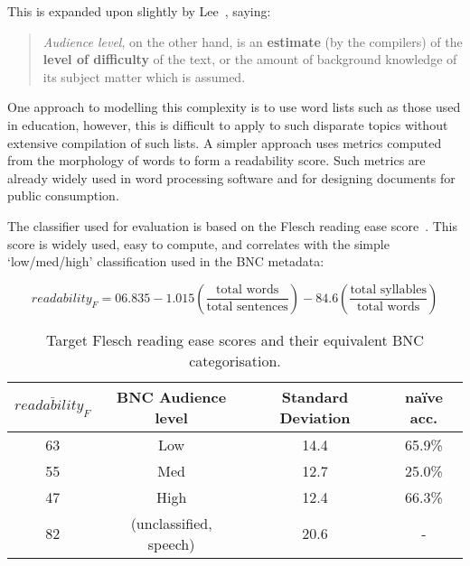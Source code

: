 This is expanded upon slightly by Lee~\cite{lee2003bnc}, saying:

\begin{quote}
    \textsl{Audience level}, on the other hand, is an \textbf{estimate} (by the compilers) of the \textbf{level of difficulty} of the text, or the amount of background knowledge of its subject matter which is assumed.
\end{quote}

One approach to modelling this complexity is to use word lists such as those used in education, however, this is difficult to apply to such disparate topics without extensive compilation of such lists.  A simpler approach uses metrics computed from the morphology of words to form a readability score.  Such metrics are already widely used in word processing software and for designing documents for public consumption.


The classifier used for evaluation is based on the Flesch reading ease score~\cite{flesch1948new}.  This score is widely used, easy to compute, and correlates with the simple `low/med/high' classification used in the BNC metadata:

$$
readability_{F} = 06.835 - 1.015 \left( \frac{\text{total words}}{\text{total sentences}} \right) - 84.6 \left( \frac{\text{total syllables}}{\text{total words}} \right)
$$


\begin{table}[h]
    \center
    \begin{tabular}{|c|c|c|c|}
        \hline 
        $\bar{readability_{F}}$ & BNC Audience level & Standard Deviation & na\"ive acc. \\
        \hline 
        63 & Low & 14.4 & 65.9\% \\
        55 & Med & 12.7 & 25.0\% \\
        47 & High & 12.4 & 66.3\% \\
        82 & (unclassified, speech) & 20.6 & - \\
        \hline
    \end{tabular}
    \caption{Target Flesch reading ease scores and their equivalent BNC categorisation.}
    \label{tab:evaluation:heuristics:fscore}
\end{table}




